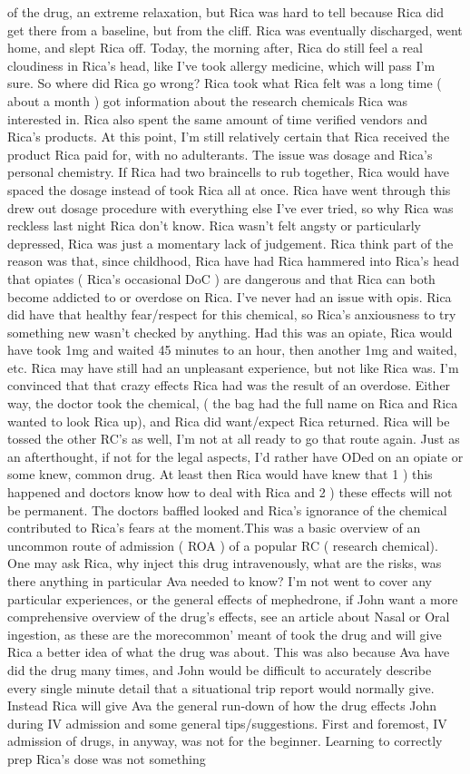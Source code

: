 \documentclass[12pt]{book}
\begin{document}
of the drug, an extreme relaxation, but Rica was hard to tell because Rica did get there from a baseline, but from the cliff. Rica was eventually discharged, went home, and slept Rica off. Today, the morning after, Rica do still feel a real cloudiness in Rica's head, like I've took allergy medicine, which will pass I'm sure. So where did Rica go wrong? Rica took what Rica felt was a long time ( about a month ) got information about the research chemicals Rica was interested in. Rica also spent the same amount of time verified vendors and Rica's products. At this point, I'm still relatively certain that Rica received the product Rica paid for, with no adulterants. The issue was dosage and Rica's personal chemistry. If Rica had two braincells to rub together, Rica would have spaced the dosage instead of took Rica all at once. Rica have went through this drew out dosage procedure with everything else I've ever tried, so why Rica was reckless last night Rica don't know. Rica wasn't felt angsty or particularly depressed, Rica was just a momentary lack of judgement. Rica think part of the reason was that, since childhood, Rica have had Rica hammered into Rica's head that opiates ( Rica's occasional DoC ) are dangerous and that Rica can both become addicted to or overdose on Rica. I've never had an issue with opis. Rica did have that healthy fear/respect for this chemical, so Rica's anxiousness to try something new wasn't checked by anything. Had this was an opiate, Rica would have took 1mg and waited 45 minutes to an hour, then another 1mg and waited, etc. Rica may have still had an unpleasant experience, but not like Rica was. I'm convinced that that crazy effects Rica had was the result of an overdose. Either way, the doctor took the chemical, ( the bag had the full name on Rica and Rica wanted to look Rica up), and Rica did want/expect Rica returned. Rica will be tossed the other RC's as well, I'm not at all ready to go that route again. Just as an afterthought, if not for the legal aspects, I'd rather have ODed on an opiate or some knew, common drug. At least then Rica would have knew that 1 ) this happened and doctors know how to deal with Rica and 2 ) these effects will not be permanent. The doctors baffled looked and Rica's ignorance of the chemical contributed to Rica's fears at the moment.This was a basic overview of an uncommon route of admission ( ROA ) of a popular RC ( research chemical). One may ask Rica, why inject this drug intravenously, what are the risks, was there anything in particular Ava needed to know? I'm not went to cover any particular experiences, or the general effects of mephedrone, if John want a more comprehensive overview of the drug's effects, see an article about Nasal or Oral ingestion, as these are the morecommon' meant of took the drug and will give Rica a better idea of what the drug was about. This was also because Ava have did the drug many times, and John would be difficult to accurately describe every single minute detail that a situational trip report would normally give. Instead Rica will give Ava the general run-down of how the drug effects John during IV admission and some general tips/suggestions. First and foremost, IV admission of drugs, in anyway, was not for the beginner. Learning to correctly prep Rica's dose was not something 
\end{document}
